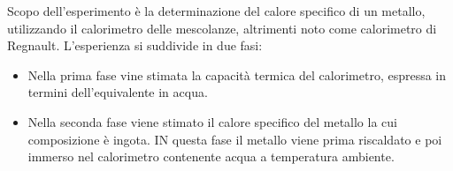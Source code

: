 Scopo dell'esperimento è la determinazione del calore specifico di un metallo, utilizzando il calorimetro delle mescolanze, altrimenti noto come calorimetro di Regnault. L'esperienza si suddivide in due fasi:
\begin{itemize}
    \item Nella prima fase vine stimata la capacità termica del calorimetro, espressa in termini dell'equivalente in acqua. 
    \item Nella seconda fase viene stimato il calore specifico del metallo la cui composizione è ingota. IN questa fase il metallo viene prima riscaldato e poi immerso nel calorimetro contenente acqua a temperatura ambiente.
\end{itemize}